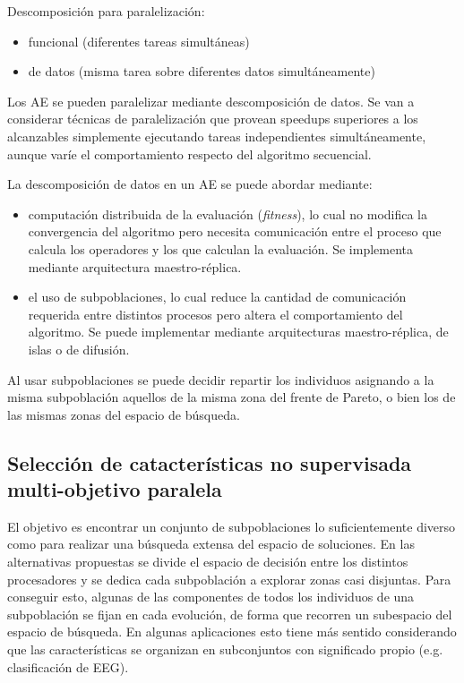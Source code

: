 \documentclass{article}
\begin{document}
Descomposición para paralelización: 
\begin{itemize}
\item funcional (diferentes tareas simultáneas)
\item de datos (misma tarea sobre diferentes datos simultáneamente)
\end{itemize}
Los AE se pueden paralelizar mediante descomposición de datos. Se van a considerar técnicas de paralelización que provean speedups superiores a los alcanzables simplemente ejecutando tareas independientes simultáneamente, aunque varíe el comportamiento respecto del algoritmo secuencial.

La descomposición de datos en un AE se puede abordar mediante:
\begin{itemize}
\item computación distribuida de la evaluación (\emph{fitness}), lo cual no modifica la convergencia del algoritmo pero necesita comunicación entre el proceso que calcula los operadores y los que calculan la evaluación. Se implementa mediante arquitectura maestro-réplica.
\item el uso de subpoblaciones, lo cual reduce la cantidad de comunicación requerida entre distintos procesos pero altera el comportamiento del algoritmo. Se puede implementar mediante arquitecturas maestro-réplica, de islas o de difusión.
\end{itemize}

Al usar subpoblaciones se puede decidir repartir los individuos asignando a la misma subpoblación aquellos de la misma zona del frente de Pareto, o bien los de las mismas zonas del espacio de búsqueda.

\subsection{Selección de catacterísticas no supervisada multi-objetivo paralela}
\label{sec-1-4}

El objetivo es encontrar un conjunto de subpoblaciones lo suficientemente diverso como para realizar una búsqueda extensa del espacio de soluciones. En las alternativas propuestas se divide el espacio de decisión entre los distintos procesadores y se dedica cada subpoblación a explorar zonas casi disjuntas. Para conseguir esto, algunas de las componentes de todos los individuos de una subpoblación se fijan en cada evolución, de forma que recorren un subespacio del espacio de búsqueda. En algunas aplicaciones esto tiene más sentido considerando que las características se organizan en subconjuntos con significado propio (e.g. clasificación de EEG).
\end{document}
